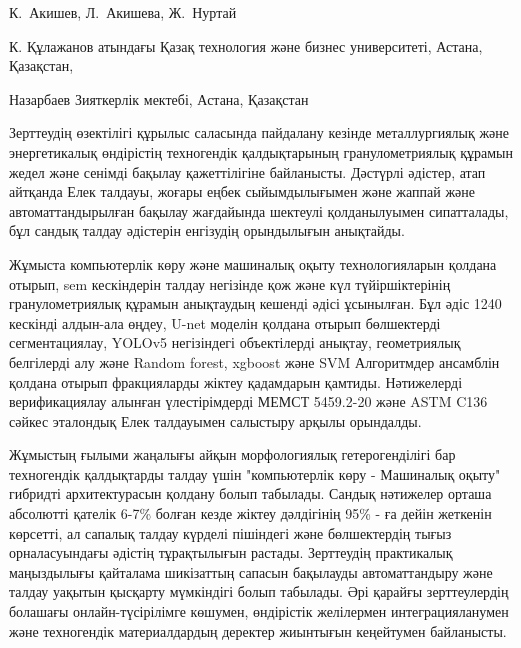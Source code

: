 
\begin{header}

К.~Акишев\envelope,
Л.~Акишева,
Ж.~Нуртай
\end{header}

\begin{affil}
К. Құлажанов атындағы Қазақ технология және бизнес университеті, Астана, Қазақстан,

Назарбаев Зияткерлік мектебі, Астана, Қазақстан

\end{affil}

Зерттеудің өзектілігі құрылыс саласында пайдалану кезінде металлургиялық
және энергетикалық өндірістің техногендік қалдықтарының гранулометриялық
құрамын жедел және сенімді бақылау қажеттілігіне байланысты. Дәстүрлі
әдістер, атап айтқанда Елек талдауы, жоғары еңбек сыйымдылығымен және
жаппай және автоматтандырылған бақылау жағдайында шектеулі қолданылуымен
сипатталады, бұл сандық талдау әдістерін енгізудің орындылығын
анықтайды.

Жұмыста компьютерлік көру және машиналық оқыту технологияларын қолдана
отырып, sem кескіндерін талдау негізінде қож және күл түйіршіктерінің
гранулометриялық құрамын анықтаудың кешенді әдісі ұсынылған. Бұл әдіс
1240 кескінді алдын-ала өңдеу, U-net моделін қолдана отырып бөлшектерді
сегментациялау, YOLOv5 негізіндегі объектілерді анықтау, геометриялық
белгілерді алу және Random forest, xgboost және SVM Алгоритмдер
ансамблін қолдана отырып фракцияларды жіктеу қадамдарын қамтиды.
Нәтижелерді верификациялау алынған үлестірімдерді МЕМСТ 5459.2-20 және
ASTM C136 сәйкес эталондық Елек талдауымен салыстыру арқылы орындалды.

Жұмыстың ғылыми жаңалығы айқын морфологиялық гетерогенділігі бар
техногендік қалдықтарды талдау үшін "компьютерлік көру - Машиналық
оқыту" гибридті архитектурасын қолдану болып табылады. Сандық нәтижелер
орташа абсолютті қателік 6-7\% болған кезде жіктеу дәлдігінің 95\% - ға
дейін жеткенін көрсетті, ал сапалық талдау күрделі пішіндегі және
бөлшектердің тығыз орналасуындағы әдістің тұрақтылығын растады.
Зерттеудің практикалық маңыздылығы қайталама шикізаттың сапасын
бақылауды автоматтандыру және талдау уақытын қысқарту мүмкіндігі болып
табылады. Әрі қарайғы зерттеулердің болашағы онлайн-түсірілімге көшумен,
өндірістік желілермен интеграцияланумен және техногендік материалдардың
деректер жиынтығын кеңейтумен байланысты.

